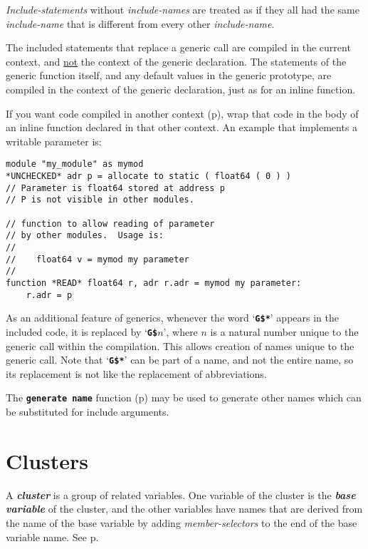 \documentclass[12pt]{article}
\newcommand{\TT}[1]{{\tt \bfseries #1}}
\newcommand{\key}[1]{{\bf \em #1}\index{#1}}
\newcommand{\mkey}[2]{{\bf \em #1}\index{#1!#2}}
\newcommand{\pagref}[1]{p\pageref{#1}}
\newcommand{\TMP}{\$}			%
\newenvironment{indpar}[1][0.3in]%
	{\begin{list}{}%
		     {\setlength{\itemsep}{0in}%
		      \setlength{\topsep}{0in}%
		      \setlength{\parsep}{1ex}%
		      \setlength{\labelwidth}{#1}%
		      \setlength{\leftmargin}{#1}%
		      \addtolength{\leftmargin}{\labelsep}}%
	 \item}%
	{\end{list}}
\begin{document}
{\em Include-statements} without {\em include-names} are treated
as if they all had the same {\em include-name} that is different
from every other {\em include-name}.

The included statements that replace a generic call are compiled in the
current context, and \underline{not} the context of the
generic declaration.  The statements of the generic function
itself, and any default values in the generic prototype,
are compiled in the context of the generic declaration,
just as for an inline function.

If you want code compiled in another
context (\pagref{CONTEXT}), wrap that code in the body of an inline function
declared in that other context.  An example that implements a writable
parameter is:
\begin{indpar}\begin{verbatim}
module "my_module" as mymod
*UNCHECKED* adr p = allocate to static ( float64 ( 0 ) )
// Parameter is float64 stored at address p
// P is not visible in other modules.

// function to allow reading of parameter
// by other modules.  Usage is:
//
//    float64 v = mymod my parameter
//
function *READ* float64 r, adr r.adr = mymod my parameter:
    r.adr = p
\end{verbatim}\end{indpar}

As an additional feature of generics, whenever the word
`\TT{G\TMP*}' appears in the included code, it is replaced
by `\TT{G\TMP$n$}', where $n$ is a natural number unique
to the generic call within the compilation.  This allows
creation of names unique to the generic call.  Note that
`\TT{G\TMP*}' can be part of a name, and not the entire name,
so its replacement is not like the replacement of abbreviations.

The \TT{generate name} function (\pagref{GENERATE-NAME})
may be used to generate other names which can be substituted
for include arguments.

\section{Clusters}
\label{CLUSTERS}

A \key{cluster} is a group of related variables.  One variable of
the cluster is the \mkey{base variable}{of cluster} of the cluster, and the
other variables have names that are derived from the
name of the base variable by adding {\em member-selectors}
to the end of the base variable name.  See \pagref{NAMES}.
\end{document}
